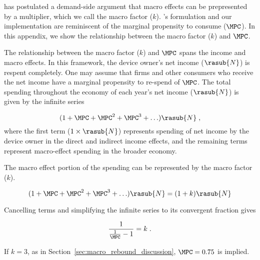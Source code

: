
\citet{Borenstein:2015aa} has postulated a demand-side argument that macro effects 
can be prepresented by a multiplier, which we call the macro factor ($k$).
\citeauthor{Borenstein:2015aa}'s formulation and our implementation 
are reminiscent of the marginal propensity to consume ($\MPC$).
In this appendix, we show the relationship between the macro factor ($k$) and $\MPC$.

The relationship between the macro factor ($k$) and $\MPC$ spans
the income and macro effects.
In this framework, the device owner's net income ($\rasub{N}$) is respent completely.
One may assume that firms and other consumers who receive the net income have a 
marginal propensity to re-spend of $\MPC$.
The total spending throughout the economy of each year's net income ($\rasub{N}$)
is given by the infinite series

\begin{equation} \label{eq:infinite_series_spending}
  (1 + \MPC + \MPC^2 + \MPC^3 + \ldots) \rasub{N} \; ,
\end{equation}
%
where the first term ($1 \times \rasub{N}$) represents spending of net income by the device owner
in the direct and indirect income effects, and
the remaining terms represent macro-effect spending in the broader economy.

The macro effect portion of the spending can be represented by the macro factor ($k$).

\begin{equation} \label{eq:mpc_and_k}
  (1 + \MPC + \MPC^2 + \MPC^3 + \ldots) \rasub{N} = (1 + k) \rasub{N}
\end{equation}

Cancelling terms and simplifying the infinite series to its convergent fraction gives

\begin{equation} \label{eq:mpc_and_k_converged}
  \frac{1}{\frac{1}{\MPC} - 1} = k \; .
\end{equation}

If $k = 3$, as in Section~\ref{sec:macro_rebound_discussion}, 
$\MPC = 0.75$ is implied.
